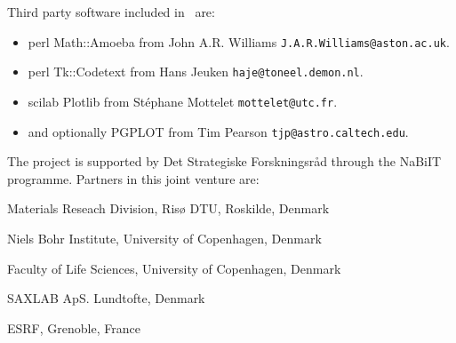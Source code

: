 Third party software included in \MCX\ are:
\begin{itemize}
\item perl Math::Amoeba from John A.R. Williams \verb+J.A.R.Williams@aston.ac.uk+.
\item perl Tk::Codetext from Hans Jeuken \verb+haje@toneel.demon.nl+.
\item scilab Plotlib from St\'ephane Mottelet \verb+mottelet@utc.fr+.
\item and optionally PGPLOT from Tim Pearson \verb+tjp@astro.caltech.edu+.
\end{itemize}

The \MCX project is supported by Det Strategiske Forskningsråd through the NaBiIT programme. Partners in this joint venture are: 
\begin{list}
\item Materials Reseach Division, Risø DTU, Roskilde, Denmark\\
\item Niels Bohr Institute, University of Copenhagen, Denmark\\
\item Faculty of Life Sciences, University of Copenhagen, Denmark\\
\item SAXLAB ApS. Lundtofte, Denmark\\
\item ESRF, Grenoble, France
\end{list}
